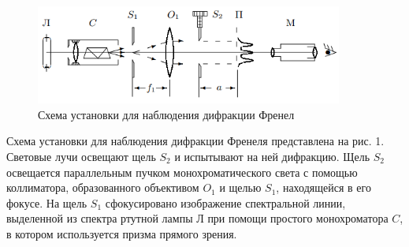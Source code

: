 \documentclass[a4paper,12pt]{article}
\begin{document}
\begin{figure}[H]\label{fig: Fresnel diffraction setup}
    \centering
    \includegraphics[width = 0.9\textwidth]{Fresnel diffraction setup.png}
    \caption{ Схема установки для наблюдения дифракции Френел}
\end{figure}
Схема установки для наблюдения дифракции Френеля представлена на рис. 1. Световые лучи освещают щель $S_2$ и испытывают на ней дифракцию. Щель $S_2$ освещается параллельным пучком монохроматического света с помощью коллиматора, образованного объективом $O_1$ и щелью $S_1$, находящейся в его фокусе. На щель $S_1$ сфокусировано изображение спектральной линии, выделенной из спектра ртутной лампы $Л$ при помощи простого монохроматора $C$, в котором используется призма прямого зрения. 
\end{document}
